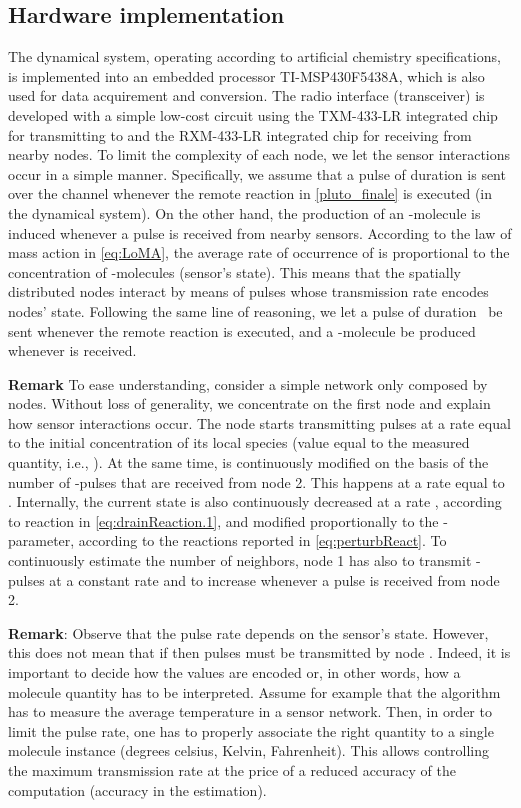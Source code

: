 \documentclass[journal]{IEEEtran}
\begin{document}
\subsection{Hardware implementation}

The dynamical system, operating according to artificial chemistry specifications, is implemented into an embedded processor TI-MSP430F5438A, which is also used for data acquirement and conversion. The radio interface (transceiver) is developed with a simple low-cost circuit using the TXM-433-LR integrated chip for transmitting to and the RXM-433-LR integrated chip for receiving from nearby nodes. {To limit the complexity of each node, we let the sensor interactions occur in a simple manner. Specifically, we assume that a pulse  of duration  is sent over the channel whenever the remote reaction  in \eqref{pluto_finale} is executed (in the dynamical system). On the other hand, the production of an -molecule is induced whenever a pulse  is received from nearby sensors. According to the law of mass action in \eqref{eq:LoMA}, the average rate of occurrence of  is proportional to the concentration of -molecules (sensor's state). This means that the spatially distributed nodes interact by means of  pulses whose transmission rate encodes nodes' state. Following the same line of reasoning, we let a pulse  of duration~ be sent whenever the remote reaction  is executed, and a -molecule be produced whenever  is received.} 

{
{\bf{Remark}} To ease understanding, consider a simple network only composed by  nodes. Without loss of generality, we concentrate on the first node and explain how sensor interactions occur. The node starts transmitting pulses  at a rate equal to the initial concentration of its local species (value equal to the measured quantity, i.e., ). At the same time,  is continuously modified on the basis of the number of -pulses that are received from node 2. This happens at a rate equal to . Internally, the current state  is also continuously decreased at a rate , according to reaction  in \eqref{eq:drainReaction.1}, and modified proportionally to the -parameter, according to the reactions reported in \eqref{eq:perturbReact}. To continuously estimate the number of neighbors, node 1 has also to transmit -pulses at a constant rate  and to increase  whenever a pulse  is received from node 2. 
}


{{\bf{Remark}}: Observe that the pulse rate depends on the sensor's state. However, this does not mean that if  then  pulses  must be transmitted by node . Indeed, it is important to decide how the values are encoded or, in other words, how a molecule quantity has to be interpreted. Assume for example that the algorithm has to measure the average temperature in a sensor network. Then, in order to limit the pulse rate, one has to properly associate the right quantity to a single molecule instance (degrees celsius, Kelvin, Fahrenheit). This allows controlling the maximum transmission rate at the price of a reduced accuracy of the computation
(accuracy in the estimation).}
\end{document}
